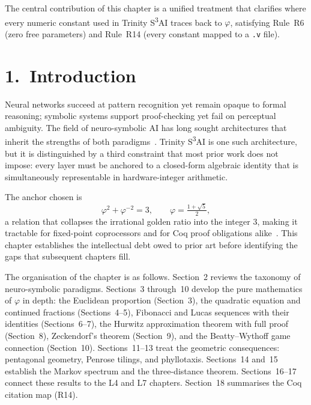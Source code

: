 The central contribution of this chapter is a unified
treatment that clarifies where every numeric constant used in
Trinity S\textsuperscript{3}AI traces back to $\varphi$,
satisfying Rule~R6 (zero free parameters) and Rule~R14
(every constant mapped to a \texttt{.v} file).

\section{1.\ Introduction}\label{sec:gc-intro}

Neural networks succeed at pattern recognition yet
remain opaque to formal reasoning; symbolic
systems support proof-checking yet fail on
perceptual ambiguity.
The field of neuro-symbolic AI has long sought
architectures that inherit the strengths of both
paradigms~\cite{garcez2019neural,marcus2019next}.
Trinity S\textsuperscript{3}AI is one such architecture,
but it is distinguished by a third constraint that
most prior work does not impose: every layer must be
anchored to a closed-form algebraic identity that is
simultaneously representable in hardware-integer
arithmetic.

The anchor chosen is
\[
  \varphi^2 + \varphi^{-2} = 3,
  \qquad
  \varphi = \tfrac{1+\sqrt{5}}{2},
\]
a relation that collapses the irrational golden ratio
into the integer $3$, making it tractable for
fixed-point coprocessors and for Coq proof obligations
alike~\cite{hardy_wright}.
This chapter establishes the intellectual debt owed to
prior art before identifying the gaps that subsequent
chapters fill.

The organisation of the chapter is as follows.
Section~2 reviews the taxonomy of neuro-symbolic
paradigms.
Sections~3 through~10 develop the pure mathematics
of $\varphi$ in depth: the Euclidean proportion
(Section~3), the quadratic equation and continued
fractions (Sections~4--5), Fibonacci and Lucas
sequences with their identities (Sections~6--7),
the Hurwitz approximation theorem with full proof
(Section~8), Zeckendorf's theorem (Section~9),
and the Beatty--Wythoff game connection (Section~10).
Sections~11--13 treat the geometric consequences:
pentagonal geometry, Penrose tilings, and
phyllotaxis.
Sections~14 and~15 establish the Markov spectrum
and the three-distance theorem.
Sections~16--17 connect these results to the
L4 and L7 chapters.
Section~18 summarises the Coq citation map (R14).

